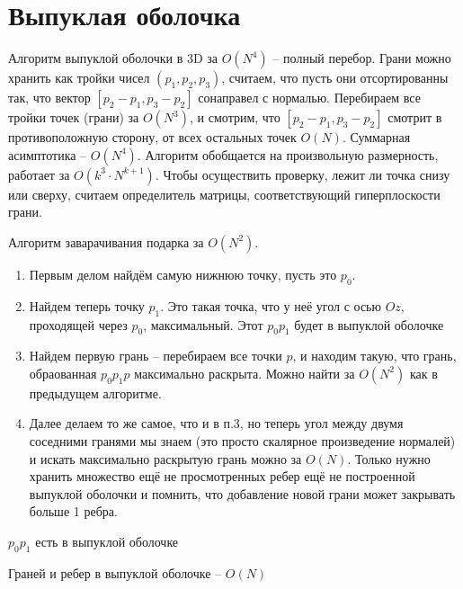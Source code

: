 \documentclass[document.tex]{subfiles}
\begin{document}
\section{Выпуклая оболочка}

\begin{algorithm}
	Алгоритм выпуклой оболочки в 3D за $O(N^4)$ -- полный перебор. Грани можно хранить как тройки чисел $(p_1, p_2, p_3)$, считаем, что пусть они отсортированны  так, что вектор $[p_2 - p_1, p_3 - p_2]$ сонаправел с нормалью. Перебираем все тройки точек (грани) за $O(N^3)$, и смотрим, что $[p_2 - p_1, p_3 - p_2]$ смотрит в противоположную сторону, от всех остальных точек $O(N)$. Суммарная асимптотика -- $O(N^4)$. Алгоритм обобщается на произвольную размерность, работает за $O(k^3 \cdot N^{k+1})$. Чтобы осуществить проверку, лежит ли точка снизу или сверху, считаем определитель матрицы, соответствующий гиперплоскости грани.
\end{algorithm}

\begin{algorithm}
	Алгоритм заварачивания подарка за $O(N^2)$.
	\begin{enumerate}
		\item Первым делом найдём самую нижнюю точку, пусть это $p_0$.
		\item Найдем теперь точку $p_1$. Это такая точка, что у неё угол с осью $Oz$, проходящей через $p_0$, максимальный. Этот $p_0p_1$ будет в выпуклой оболочке
		\item Найдем первую грань -- перебираем все точки $p$, и находим такую, что грань, обраованная $p_0p_1p$ максимально раскрыта. Можно найти за $O(N^2)$ как в предыдущем алгоритме.

		\item Далее делаем то же самое, что и в п.3, но теперь угол между двумя соседними гранями мы знаем (это просто скалярное произведение нормалей) и искать максимально раскрытую грань можно за $O(N)$. Только нужно хранить множество ещё не просмотренных ребер ещё не построенной выпуклой оболочки и помнить, что добавление новой грани может закрывать больше 1 ребра.
	\end{enumerate}
\end{algorithm}

\begin{statement}
	$p_0p_1$ есть в выпуклой оболочке
\end{statement}

\begin{statement}
	Граней и ребер в выпуклой оболочке -- $O(N)$
\end{statement}
\end{document}
